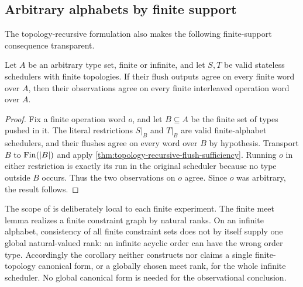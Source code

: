 \subsection{Arbitrary alphabets by finite support}

The topology-recursive formulation also makes the following finite-support
consequence transparent.

\begin{corollary}
\label{cor:infinite-alphabet-finite-support}
Let \(A\) be an arbitrary type set, finite or infinite, and let \(S,T\) be
valid stateless schedulers with finite topologies.  If their flush outputs
agree on every finite word over \(A\), then their observations agree on every
finite interleaved operation word over \(A\).
\end{corollary}

\begin{proof}
Fix a finite operation word \(o\), and let \(B\subseteq A\) be the finite set
of types pushed in it.  The literal restrictions \(S|_B\) and \(T|_B\) are
valid finite-alphabet schedulers, and their flushes agree on every word over
\(B\) by hypothesis.  Transport \(B\) to \(\operatorname{Fin}(|B|)\) and apply
\autoref{thm:topology-recursive-flush-sufficiency}.  Running \(o\) in either
restriction is exactly its run in the original scheduler because no type
outside \(B\) occurs.  Thus the two observations on \(o\) agree.  Since \(o\)
was arbitrary, the result follows.
\end{proof}

The scope of  is deliberately
local to each finite experiment.  The finite meet lemma realizes a finite
constraint graph by natural ranks.  On an infinite alphabet, consistency of
all finite constraint sets does not by itself supply one global
natural-valued rank: an infinite acyclic order can have the wrong order type.
Accordingly the corollary neither constructs nor claims a single
finite-topology canonical form, or a globally chosen meet rank, for the whole
infinite scheduler.  No global canonical form is needed for the observational
conclusion.
